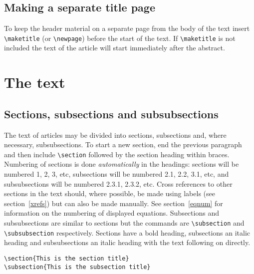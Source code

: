 \documentclass[12pt]{iopart}
\begin{document}
\subsection{Making a separate title page}
To keep the header material on a separate page from the
body of the text insert \verb"\maketitle" (or \verb"\newpage") before the start of the text. 
If \verb"\maketitle" is not included the text of the
article will start immediately after the abstract.  

\section{The text}
\subsection{Sections, subsections and subsubsections}
The text of articles may be divided into sections, subsections and, where necessary, 
subsubsections. To start a new section, end the previous paragraph and 
then include \verb"\section" followed by the section heading within braces. 
Numbering of sections is done {\it automatically} in the headings: 
sections will be numbered 1, 2, 3, etc, subsections will be numbered 
2.1, 2.2,  3.1, etc, and subsubsections will be numbered 2.3.1, 2.3.2, 
etc.  Cross references to other sections in the text should, where
possible, be made using 
labels (see section~\ref{xrefs}) but can also
be made manually. See section~\ref{eqnum} for information on the numbering of displayed equations. Subsections and subsubsections are 
similar to sections but 
the commands are \verb"\subsection" and \verb"\subsubsection" respectively. 
Sections have a bold heading, subsections an italic heading and 
subsubsections an italic heading with the text following on directly.
\small\begin{verbatim}
\section{This is the section title}
\subsection{This is the subsection title}
\end{verbatim}\normalsize
\end{document}

